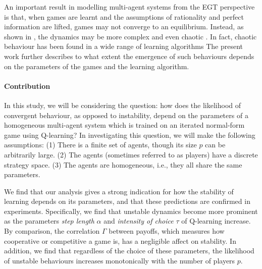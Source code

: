 \documentclass{article}
\begin{document}
An important result in modelling multi-agent systems from the EGT
perspective is that, when games are learnt and the assumptions of
rationality and perfect information are lifted, games may not converge
to an equilibrium. Instead, as shown in \cite{sanders:prevalence}, the
dynamics may be more complex and even chaotic \cite{strogatz:2000}. In fact, chaotic behaviour has been found in a wide range of learning algorithms \cite{svs:fp,piliouras:chaoticmaps} The present work further
describes to what extent the emergence of such behaviours depends on the
parameters of the games and the learning algorithm. 

\paragraph{Contribution}
In this study, we will be considering the question: how does the likelihood of convergent behaviour, as opposed to instability, depend on the parameters of a homogeneous multi-agent system which is trained on an iterated normal-form game using Q-learning?
In investigating this
question, we will make the following assumptions:
%
    (1) There is a finite set of agents, though its size $p$ can be
      arbitrarily large.
    (2) The agents (sometimes referred to as players) have a discrete strategy space.
%
(3) The agents  are homogeneous, i.e., they all share the same parameters. 
%    

We find that our analysis gives a strong indication for how the stability of learning depends on its parameters, and that these predictions are confirmed in experiments. Specifically, we find that unstable dynamics become more prominent as the parameters \textit{step length}
$\alpha$ and \textit{intensity of choice} $\tau$  of
Q-learning increase. By comparison, the
correlation $\Gamma$ between payoffs, which measures how cooperative or competitive a game is, has a negligible affect on stability. In addition, we find that regardless of the choice of these
parameters, the likelihood of unstable behaviours increases monotonically with the number of players $p$.


\end{document}
